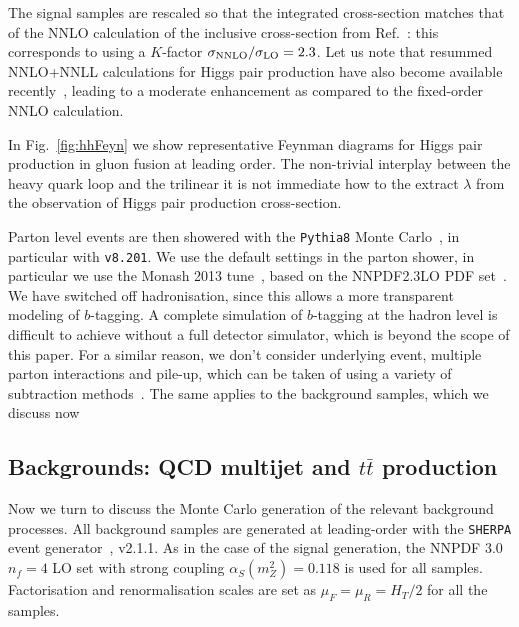 The signal samples are rescaled so that the integrated cross-section matches that of the
NNLO calculation of the inclusive cross-section from Ref.~\cite{deFlorian:2013jea}:
this corresponds to using a $K$-factor $\sigma_{\rm NNLO}/\sigma_{\rm LO}=2.3$.
%
Let us note that resummed NNLO+NNLL calculations for Higgs pair production have also become available recently~\cite{deFlorian:2015moa},
leading to a moderate enhancement as compared to the fixed-order NNLO calculation.


In Fig.~\ref{fig:hhFeyn} we show representative Feynman diagrams
    for Higgs pair production in gluon fusion at
    leading order.
    The non-trivial interplay between the heavy quark loop and
    the trilinear it is not immediate how to the extract
    $\lambda$ from the observation of Higgs pair
    production cross-section.


%
Parton level events are then showered with the {\tt Pythia8} Monte
Carlo~\cite{Sjostrand:2007gs,Sjostrand:2014zea}, in particular with {\tt v8.201}.
%
We use the default settings in the parton shower, in particular
we use the Monash 2013 tune~\cite{Skands:2014pea}, based on the NNPDF2.3LO PDF set~\cite{Ball:2012cx}.
%
We have switched off hadronisation, since this allows a more transparent modeling of
$b$-tagging.
%
A complete simulation of $b$-tagging at the hadron level is difficult to achieve without a full
detector simulator, which is beyond the scope of this paper.
%
For a similar reason, we don't consider underlying event, multiple parton interactions and
pile-up, which can be taken of using a variety of subtraction methods~\cite{Cacciari:2009dp}.
%
The same applies to the background samples, which we discuss now

\subsection{Backgrounds: QCD multijet and $t\bar{t}$ production}

Now we turn to discuss the Monte Carlo generation of the relevant background processes.
%
All background samples are generated at leading-order
with the {\tt SHERPA} event generator~\cite{Gleisberg:2008ta}, v2.1.1.
%
As in the case of the signal generation, the NNPDF 3.0 $n_f = 4$ LO set with strong coupling $\alpha_S(m_Z^2)=0.118$ is used for all samples.
%
Factorisation and renormalisation scales are set as $\mu_F=\mu_R=H_T/2$ for all
the samples.

